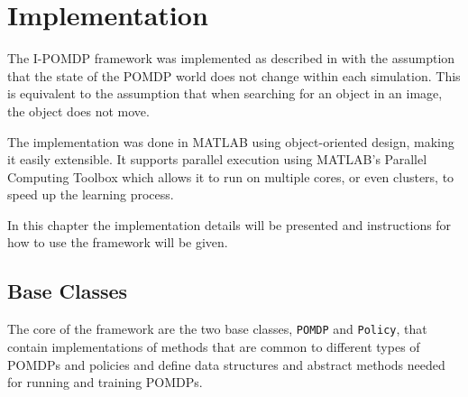 
\chapter{Implementation}
\label{ch:Implementation}
The I-POMDP framework was implemented as described in \cite{Butko2010b} with the assumption that the state of the POMDP world does not change within each simulation. This is equivalent to the assumption that when searching for an object in an image, the object does not move.

The implementation was done in MATLAB using object-oriented design, making it easily extensible. It supports parallel execution using MATLAB's Parallel Computing Toolbox\texttrademark{} which allows it to run on multiple cores, or even clusters, to speed up the learning process.

In this chapter the implementation details will be presented and instructions for how to use the framework will be given.

\section{Base Classes}
\label{sec:BaseClasses}
The core of the framework are the two base classes, \texttt{POMDP} and \texttt{Policy}, that contain implementations of methods that are common to different types of POMDPs and policies and define data structures and abstract methods needed for running and training POMDPs.

